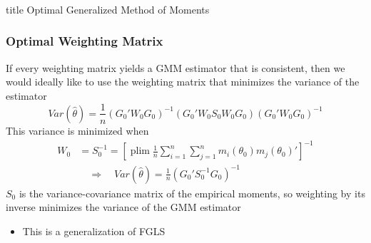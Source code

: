 \documentclass{beamer}
\DeclareMathOperator*{\plim}{plim}
\begin{document}
\begin{frame}\frametitle{}
    \vfill
    \centering
    \begin{beamercolorbox}[center]{title}
        \Large Optimal Generalized Method of Moments
    \end{beamercolorbox}
    \vfill
\end{frame}

\begin{frame}\frametitle{Optimal Weighting Matrix}
    If every weighting matrix yields a GMM estimator that is consistent, then we would ideally like to use the weighting matrix that minimizes the variance of the estimator
    $$Var(\hat{\theta}) = \frac{1}{n} (G_0' W_0 G_0)^{-1} (G_0' W_0 S_0 W_0 G_0) (G_0' W_0 G_0)^{-1}$$
    This variance is minimized when
    \begin{align*}
    	W_0 &= S_0^{-1} = \left[ \plim \frac{1}{n} \sum_{i = 1}^n \sum_{j = 1}^n m_i(\theta_0) m_j(\theta_0)' \right]^{-1} \\
    	& \quad \Rightarrow \quad Var(\hat{\theta}) = \frac{1}{n} (G_0' S_0^{-1} G_0)^{-1}
    \end{align*}
    $S_0$ is the variance-covariance matrix of the empirical moments, so weighting by its inverse minimizes the variance of the GMM estimator
    \begin{itemize}
    	\item This is a generalization of FGLS
    \end{itemize}
\end{frame}
\end{document}

